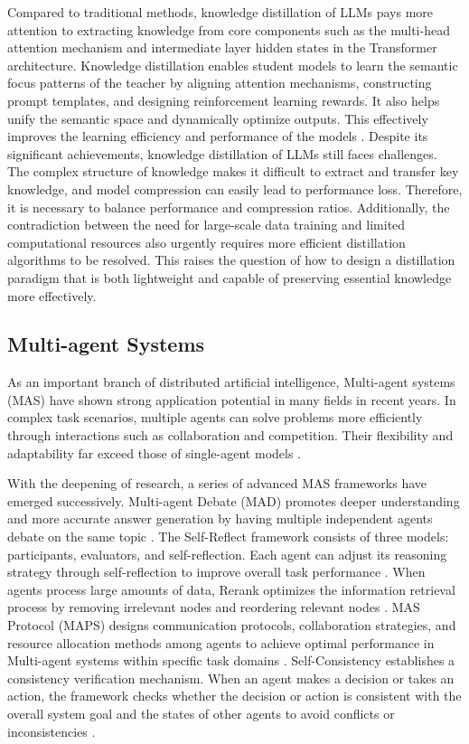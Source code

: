 \documentclass[preprint,12pt]{elsarticle}
\begin{document}
Compared to traditional methods, knowledge distillation of LLMs pays more attention to extracting knowledge from core components such as the multi-head attention mechanism and intermediate layer hidden states in the Transformer architecture. Knowledge distillation enables student models to learn the semantic focus patterns of the teacher by aligning attention mechanisms, constructing prompt templates, and designing reinforcement learning rewards. It also helps unify the semantic space and dynamically optimize outputs. This effectively improves the learning efficiency and performance of the models \cite{Yang2024,Liu2024,Yang2024b}. Despite its significant achievements, knowledge distillation of LLMs still faces challenges. The complex structure of knowledge makes it difficult to extract and transfer key knowledge, and model compression can easily lead to performance loss. Therefore, it is necessary to balance performance and compression ratios. Additionally, the contradiction between the need for large-scale data training and limited computational resources also urgently requires more efficient distillation algorithms to be resolved. This raises the question of how to design a distillation paradigm that is both lightweight and capable of preserving essential knowledge more effectively.

\subsection{Multi-agent Systems}

As an important branch of distributed artificial intelligence, Multi-agent systems (MAS) have shown strong application potential in many fields in recent years. In complex task scenarios, multiple agents can solve problems more efficiently through interactions such as collaboration and competition. Their flexibility and adaptability far exceed those of single-agent models \cite{Liang2023,Wang2025,Kang2024}.

With the deepening of research, a series of advanced MAS frameworks have emerged successively. Multi-agent Debate (MAD) promotes deeper understanding and more accurate answer generation by having multiple independent agents debate on the same topic \cite{Smit2023}. The Self-Reflect framework consists of three models: participants, evaluators, and self-reflection. Each agent can adjust its reasoning strategy through self-reflection to improve overall task performance \cite{Yuan2025,Shinn2023}. When agents process large amounts of data, Rerank optimizes the information retrieval process by removing irrelevant nodes and reordering relevant nodes \cite{Loem2023,He2024}. MAS Protocol (MAPS) designs communication protocols, collaboration strategies, and resource allocation methods among agents to achieve optimal performance in Multi-agent systems within specific task domains \cite{He2024,Thelasingha2025}. Self-Consistency establishes a consistency verification mechanism. When an agent makes a decision or takes an action, the framework checks whether the decision or action is consistent with the overall system goal and the states of other agents to avoid conflicts or inconsistencies \cite{Li2024,Wang2022}.
\end{document}
